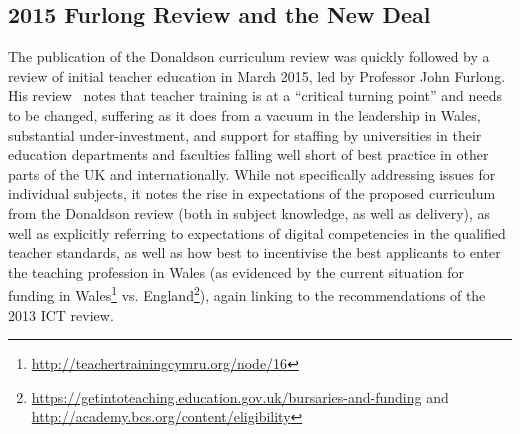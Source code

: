 
\subsection{2015 Furlong Review and the New Deal}

The publication of the Donaldson curriculum review was quickly
followed by a review of initial teacher education in March 2015, led
by Professor John Furlong. His review~\cite{Furlong:2015} notes
that teacher training is at a ``critical turning point'' and needs
to be changed, 
suffering as it does from
a vacuum in the leadership in Wales, substantial under-investment,
and support for staffing by universities in their
education departments and faculties falling well short of best
practice in other parts of the UK and internationally. While not
specifically addressing issues for individual subjects, it notes the
rise in expectations of the proposed curriculum from the Donaldson
review (both in subject knowledge, as well as delivery), as well as
explicitly referring to expectations of digital competencies in the
qualified teacher standards, as well as how best to incentivise the
best applicants to enter the teaching profession in Wales (as
evidenced by the current situation for funding in
Wales\footnote{\url{http://teachertrainingcymru.org/node/16}}
vs. England\footnote{\url{https://getintoteaching.education.gov.uk/bursaries-and-funding}
and \url{http://academy.bcs.org/content/eligibility}}), again linking
to the recommendations of the 2013 ICT review.

